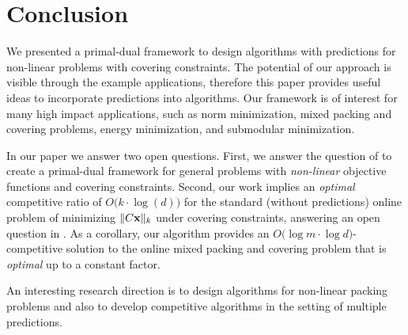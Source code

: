 
\section{Conclusion}

We presented a primal-dual framework to design algorithms with predictions for non-linear problems with covering constraints.
The potential of our approach is visible through the example applications, therefore this paper provides useful ideas to incorporate predictions into algorithms.
Our framework is of interest for many high impact applications, such as norm minimization, mixed packing and covering problems, energy minimization, and submodular minimization.

In our paper we answer two open questions.
First, we answer the question of \cite{BamasMaggiori20:The-Primal-Dual-method} to create a primal-dual framework for general problems with \emph{non-linear} objective functions and covering constraints.
Second, our work implies an \emph{optimal} competitive ratio of $O\bigl( k \cdot \log (d)\bigr)$ for the standard (without predictions) online problem of minimizing $\|C \mathbf{x}\|_{k}$ under covering constraints, answering an open question in \cite{NagarajanShen17:Online-Covering}. As a corollary, our algorithm provides an $O\bigl( \log m \cdot \log d \bigr)$-competitive solution to the online mixed packing and covering problem that is \emph{optimal} up to a constant factor.

An interesting research direction is to design algorithms for non-linear packing problems and also to develop competitive algorithms in the setting of multiple predictions.
